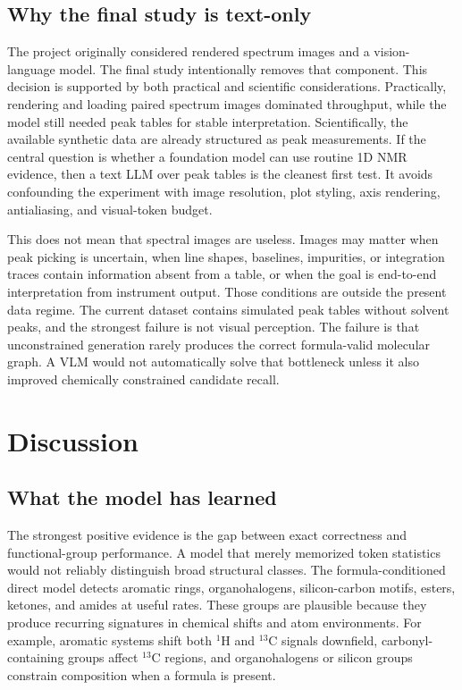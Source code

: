 \documentclass{article}
\begin{document}
\subsection{Why the final study is text-only}

The project originally considered rendered spectrum images and a vision-language model. The final study intentionally removes that component. This decision is supported by both practical and scientific considerations. Practically, rendering and loading paired spectrum images dominated throughput, while the model still needed peak tables for stable interpretation. Scientifically, the available synthetic data are already structured as peak measurements. If the central question is whether a foundation model can use routine 1D NMR evidence, then a text LLM over peak tables is the cleanest first test. It avoids confounding the experiment with image resolution, plot styling, axis rendering, antialiasing, and visual-token budget.

This does not mean that spectral images are useless. Images may matter when peak picking is uncertain, when line shapes, baselines, impurities, or integration traces contain information absent from a table, or when the goal is end-to-end interpretation from instrument output. Those conditions are outside the present data regime. The current dataset contains simulated peak tables without solvent peaks, and the strongest failure is not visual perception. The failure is that unconstrained generation rarely produces the correct formula-valid molecular graph. A VLM would not automatically solve that bottleneck unless it also improved chemically constrained candidate recall.

\section{Discussion}

\subsection{What the model has learned}

The strongest positive evidence is the gap between exact correctness and functional-group performance. A model that merely memorized token statistics would not reliably distinguish broad structural classes. The formula-conditioned direct model detects aromatic rings, organohalogens, silicon-carbon motifs, esters, ketones, and amides at useful rates. These groups are plausible because they produce recurring signatures in chemical shifts and atom environments. For example, aromatic systems shift both \(^{1}\)H and \(^{13}\)C signals downfield, carbonyl-containing groups affect \(^{13}\)C regions, and organohalogens or silicon groups constrain composition when a formula is present.
\end{document}
